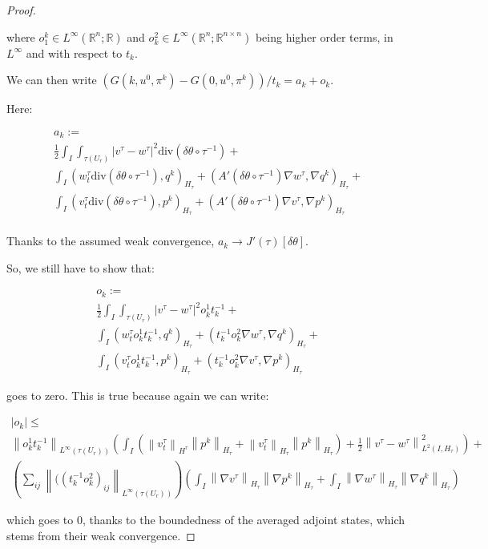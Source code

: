\documentclass[english,a4paper,9pt,oneside]{scrbook}	%
\theoremstyle{break}
\newenvironment{mproof}[1][\proofname]{%
  \begin{proof}[#1]$ $\par\nobreak\ignorespaces
}{%
  \end{proof}
}
\renewcommand*{\proofname}{Proof}
\theoremstyle{remark}
\newcommand{\mR}{\mathbb{R}}
\newcommand{\norm}[1]{\left\lVert#1\right\rVert}
\newcommand{\te}{\theta}
\newcommand{\dive}{\text{div}}
\begin{document}
\begin{mproof}
where $o_1^k \in L^\infty(\mR^n;\mR)$ and $o^2_k \in L^\infty(\mR^n;\mR^{n\times n})$ being higher order terms, in $L^\infty$ and with respect to $t_k$.

We can then write $(G(k,u^0,\pi^k)-G(0,u^0,\pi^k))/t_k = a_k + o_k$.

Here:

\begin{align*}
a_k :=\\
\frac{1}{2}\int_I \int_{\tau(U_r)}|v^\tau-w^\tau|^2\dive(\delta \te \circ \tau^{-1})+\\
\int_I ( w_t^\tau \dive(\delta \te \circ \tau^{-1}), q^k)_{H_\tau}+ (A'(\delta \te \circ \tau^{-1}) \nabla w^\tau, \nabla q^k)_{H_\tau}+\\
\int_I (v_t^\tau \dive(\delta \te \circ \tau^{-1}),p^k )_{H_\tau} + (A'(\delta \te \circ \tau^{-1})  \nabla v^\tau, \nabla p^k)_{H_\tau} \\
\end{align*}

Thanks to the assumed weak convergence, $a_k\rightarrow J'(\tau)[\delta \te]$.

So, we still have to show that:

\begin{align*}
o_k:=\\
\frac{1}{2}\int_I \int_{\tau(U_r)}|v^\tau-w^\tau|^2 o^1_k t_k^{-1}+\\
\int_I ( w_t^\tau o^1_kt_k^{-1}, q^k)_{H_\tau}+ (t_k^{-1}o^2_k\nabla w^\tau, \nabla q^k)_{H_\tau}+\\
\int_I (v_t^\tau o^1_k t_k^{-1},p^k )_{H_\tau} + (t_k^{-1}o^2_k \nabla v^\tau, \nabla p^k)_{H_\tau} 
\end{align*}

goes to zero. This is true because again we can write:

\begin{align*}
|o_k| \leq\\ \norm{ o^1_kt_k^{-1}}_{L^\infty(\tau(U_r))}\left (\int_I( \norm{v_t^\tau}_{H^\tau}\norm{p^k}_{H_\tau}+ \norm{v_t^\tau}_{H_\tau}\norm{p^k}_{H_\tau})+\frac{1}{2}\norm{v^\tau-w^\tau}^2_{L^2(I,H_\tau)}\right )+\\
\left(\sum_{ij} \norm{((t_k^{-1}o^2_k)_{ij}}_{L^\infty(\tau(U_r))}\right )\left (
\int_I \norm{\nabla v^\tau}_{H_\tau} \norm{\nabla p^k}_{H_\tau}+ \int_I \norm{\nabla w^\tau}_{H_\tau} \norm{\nabla q^k}_{H_\tau}\right )
\end{align*}

which goes to $0$, thanks to the boundedness of the averaged adjoint states, which stems from their weak convergence.


\end{mproof}
\end{document}
